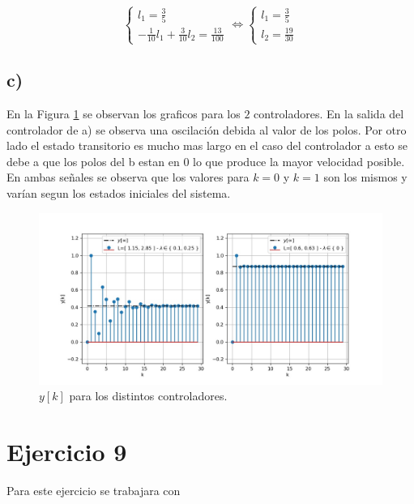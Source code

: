 \documentclass[11pt,a4paper]{article}
\newcommand{\siseq}[1]{ \left\{ \begin{array}{c}
    #1
\end{array} \right. }
\begin{document}
       \begin{equation}
           \siseq{
               l_1 = \frac{3}{5} \\ 
               -\frac{1}{10}l_1 + \frac{3}{10}l_2 = \frac{13}{100}
           } \Leftrightarrow
           \siseq{
               l_1 = \frac{3}{5} \\ 
               l_2 = \frac{19}{30}
           }
       \end{equation}

    \subsection*{c)}

    En la Figura \ref{fig:8-c} se observan los graficos para los $2$ controladores. En la salida del controlador de a) se 
    observa una oscilación debida al valor de los polos. Por otro lado el estado transitorio es mucho mas largo en el caso 
    del controlador a esto se debe a que los polos del b estan en $0$ lo que produce la mayor velocidad posible.
    En ambas señales se observa que los valores para $k=0$ y $k=1$ son los mismos y varían segun los estados 
    iniciales del sistema.

    \begin{figure}
        \centering
        \includegraphics[width=\textwidth]{Img/8-c.jpg}
        \caption{$y[k]$ para los distintos controladores.}
        \label{fig:8-c}
    \end{figure}

    \section*{Ejercicio 9}

    Para este ejercicio se trabajara con 
\end{document}
